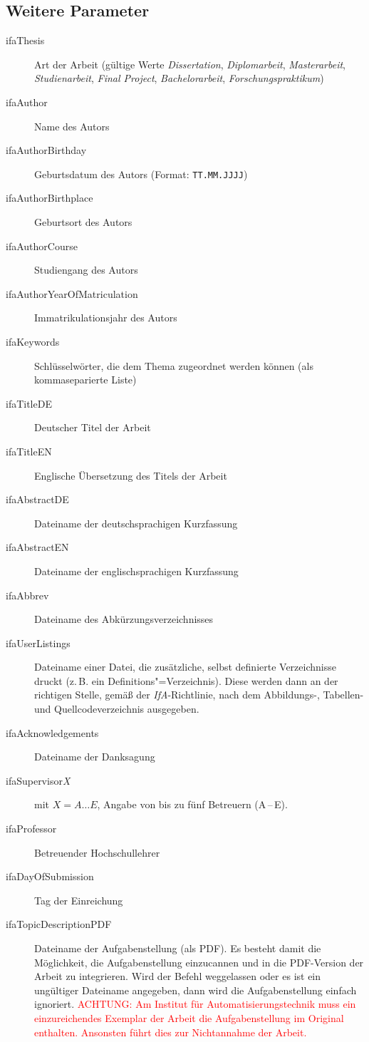 \subsection{Weitere Parameter}

\begin{description}
  \item[ifaThesis] Art der Arbeit (gültige Werte \emph{Dissertation}, \emph{Diplomarbeit}, \emph{Masterarbeit}, \emph{Studienarbeit}, \emph{Final Project}, \emph{Bachelorarbeit}, \emph{Forschungspraktikum})
  \item[ifaAuthor] Name des Autors
  \item[ifaAuthorBirthday] Geburtsdatum des Autors (Format: \verb-TT.MM.JJJJ-)
  \item[ifaAuthorBirthplace] Geburtsort des Autors
  \item[ifaAuthorCourse] Studiengang des Autors
  \item[ifaAuthorYearOfMatriculation] Immatrikulationsjahr des Autors
  \item[ifaKeywords] Schlüsselwörter, die dem Thema zugeordnet werden können (als kommaseparierte Liste)
  \item[ifaTitleDE] Deutscher Titel der Arbeit
  \item[ifaTitleEN] Englische Übersetzung des Titels der Arbeit
  \item[ifaAbstractDE] Dateiname der deutschsprachigen Kurzfassung
  \item[ifaAbstractEN] Dateiname der englischsprachigen Kurzfassung
  \item[ifaAbbrev] Dateiname des Abkürzungsverzeichnisses
  \item[ifaUserListings] Dateiname einer Datei, die zusätzliche, selbst definierte Verzeichnisse druckt (z.\,B. ein
  Definitions"=Verzeichnis). Diese werden dann an der richtigen Stelle, gemäß der \emph{IfA}-Richtlinie, nach dem
  Abbildungs-, Tabellen- und Quellcodeverzeichnis ausgegeben.
  \item[ifaAcknowledgements] Dateiname der Danksagung
  \item[ifaSupervisor{\emph X}] mit $X=A\dots E$, Angabe von bis zu fünf Betreuern (A\,--\,E).
  \item[ifaProfessor] Betreuender Hochschullehrer
  \item[ifaDayOfSubmission] Tag der Einreichung
  \item[ifaTopicDescriptionPDF] Dateiname der Aufgabenstellung (als PDF). Es besteht damit die Möglichkeit, die Aufgabenstellung einzucannen und in die PDF-Version der Arbeit zu integrieren. Wird der Befehl weggelassen oder es ist ein ungültiger Dateiname angegeben, dann wird die Aufgabenstellung einfach ignoriert. \textcolor{red}{ACHTUNG: Am Institut für Automatisierungstechnik muss ein einzureichendes Exemplar der Arbeit die Aufgabenstellung im Original enthalten. Ansonsten führt dies zur Nichtannahme der Arbeit.}

\end{description}

